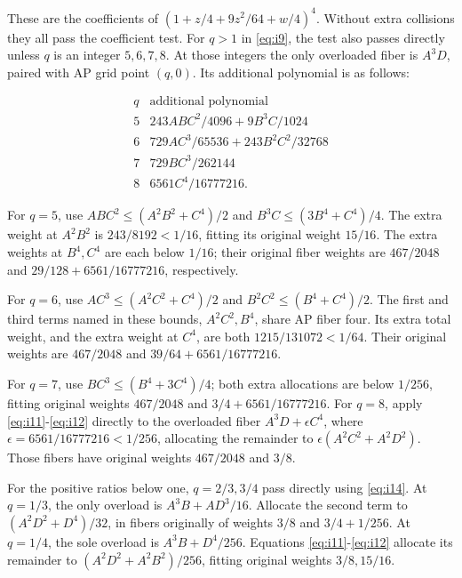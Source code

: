 These are the coefficients of \((1+z/4+9z^2/64+w/4)^4\). Without extra
collisions they all pass the coefficient test. For \(q>1\) in \eqref{eq:i9}, the test
also passes directly unless \(q\) is an integer \(5,6,7,8\). At those
integers the only overloaded fiber is \(A^3D\), paired with AP grid point
\((q,0)\). Its additional polynomial is as follows:

\begin{equation}\label{eq:i15}
\begin{array}{c|l}
q&\text{additional polynomial}\\\hline
5&243ABC^2/4096+9B^3C/1024\\
6&729AC^3/65536+243B^2C^2/32768\\
7&729BC^3/262144\\
8&6561C^4/16777216.
\end{array}
\end{equation}

For \(q=5\), use
\(ABC^2\le(A^2B^2+C^4)/2\) and
\(B^3C\le(3B^4+C^4)/4\). The extra weight at \(A^2B^2\) is
\(243/8192<1/16\), fitting its original weight \(15/16\). The extra
weights at \(B^4,C^4\) are each below \(1/16\); their original fiber
weights are \(467/2048\) and \(29/128+6561/16777216\), respectively.

For \(q=6\), use \(AC^3\le(A^2C^2+C^4)/2\) and
\(B^2C^2\le(B^4+C^4)/2\). The first and third terms named in these
bounds, \(A^2C^2,B^4\), share AP fiber four. Its extra total weight, and
the extra weight at \(C^4\), are both \(1215/131072<1/64\). Their
original weights are \(467/2048\) and \(39/64+6561/16777216\).

For \(q=7\), use \(BC^3\le(B^4+3C^4)/4\); both extra allocations are
below \(1/256\), fitting original weights \(467/2048\) and
\(3/4+6561/16777216\). For \(q=8\), apply \eqref{eq:i11}-\eqref{eq:i12} directly to the
overloaded fiber \(A^3D+\epsilon C^4\), where
\(\epsilon=6561/16777216<1/256\), allocating the remainder to
\(\epsilon(A^2C^2+A^2D^2)\). Those fibers have original weights
\(467/2048\) and \(3/8\).

For the positive ratios below one, \(q=2/3,3/4\) pass directly using \eqref{eq:i14}.
At \(q=1/3\), the only overload is \(A^3B+AD^3/16\). Allocate the second
term to \((A^2D^2+D^4)/32\), in fibers originally of weights
\(3/8\) and \(3/4+1/256\). At \(q=1/4\), the sole overload is
\(A^3B+D^4/256\). Equations \eqref{eq:i11}-\eqref{eq:i12} allocate its remainder to
\((A^2D^2+A^2B^2)/256\), fitting original weights \(3/8,15/16\).


